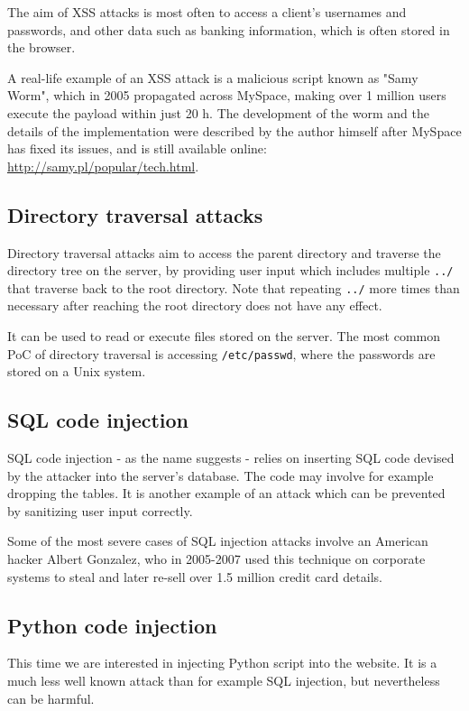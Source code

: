 \documentclass[11pt,journal]{article}
\begin{document}
	The aim of XSS attacks is most often to access a client's usernames and passwords, and other data such as banking information, which is often stored in the browser.
	
	A real-life example of an XSS attack is a malicious script known as "Samy Worm", which in 2005 propagated across MySpace, making over 1 million users execute the payload within just 20 h. The  development of the worm and the details of the implementation were described by the author himself after MySpace has fixed its issues, and is still available online: \url{http://samy.pl/popular/tech.html}.
	
	\subsection{Directory traversal attacks}
	Directory traversal attacks aim to access the parent directory and traverse the directory tree on the server, by providing user input which includes multiple \texttt{../} that traverse back to the root directory. Note that repeating \texttt{../} more times than necessary after reaching the root directory does not have any effect.
	
	It can be used to read or execute files stored on the server. The most common PoC of directory traversal is accessing \texttt{/etc/passwd}, where the passwords are stored on a Unix system.
	
	
	\subsection{SQL code injection}
	SQL code injection - as the name suggests - relies on inserting SQL code devised by the attacker into the server's database. The code may involve for example dropping the tables. It is another example of an attack which can be prevented by sanitizing user input correctly.
	
	Some of the most severe cases of SQL injection attacks involve an American hacker Albert Gonzalez, who in 2005-2007 used this technique on corporate systems to steal and later re-sell over 1.5 million credit card details\cite{Gonzalez}.
	
	
	\subsection{Python code injection}
	This time we are interested in injecting Python script into the website. It is a much less well known attack than for example SQL injection, but nevertheless can be harmful.
	
\end{document}
